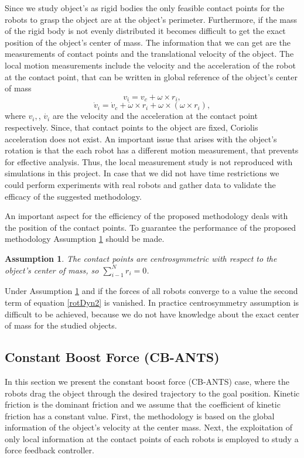\documentclass[letterpaper, 10 pt, conference]{ieeeconf}
\newtheorem{assumption}{\textbf{Assumption}}
\begin{document}
Since we study object's as rigid bodies the only feasible contact points for the robots to grasp the object are at the object's perimeter. Furthermore, if the mass of the rigid body is not evenly distributed it becomes difficult to get the exact position of the object's center of mass. The information that we can get are the measurements of contact points and the translational velocity of the object. The local motion measurements include the velocity and the acceleration of the robot at the contact point, that can be written in global reference of the object's center of mass 
\begin{equation}
v_i=v_c +\omega \times r_i,
\end{equation}
\begin{equation}
\dot{v}_i=\dot{v}_c +\dot{\omega }\times r_i+\omega \times (\omega \times r_i),
\end{equation}
where $v_i,$, $\dot{v_i}$ are the velocity and the acceleration at the contact point respectively. Since, that contact points to the object are fixed, Coriolis acceleration does not exist. An important issue that arises with the object's rotation is that the each robot has a different motion measurement, that prevents for effective analysis. Thus, the local measurement study is not reproduced with simulations in this project. In case that we did not have time restrictions we could perform experiments with real robots and gather data to validate the efficacy of the suggested methodology.

An important aspect for the efficiency of the proposed methodology deals with the position of the contact points. To guarantee the performance of the proposed methodology Assumption \ref{as3} should be made.\vspace{.2cm}
\begin{assumption}\label{as3}
\textit{The contact points are centrosymmetric with respect to the object's center of mass, so $\sum_{i-1}^{N}r_i=0$.} \vspace{.2cm}
\end{assumption}
Under Assumption \ref{as3} and if the forces of all robots converge to a value the second term of equation \ref{rotDyn2} is vanished. In practice centrosymmetry assumption is difficult to be achieved, because we do not have knowledge about the exact center of mass for the studied objects.

\subsection{Constant Boost Force (CB-ANTS)}\label{cb}
In this section we present the constant boost force (CB-ANTS) case, where the robots drag the object through the desired trajectory to the goal position. Kinetic friction is the dominant friction and we assume that the coefficient of kinetic friction has a constant value. First, the methodology is based on the global information of the object's velocity at the center mass. Next, the exploitation of only local information at the contact points of each robots is employed to study a force feedback controller.
\end{document}
